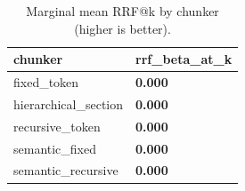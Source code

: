\begin{table}[t]
\centering
\small
\begin{tabular}{l l}
\toprule
chunker & rrf_beta_at_k \\
\midrule
fixed_token & \textbf{0.000} \\
hierarchical_section & \textbf{0.000} \\
recursive_token & \textbf{0.000} \\
semantic_fixed & \textbf{0.000} \\
semantic_recursive & \textbf{0.000} \\
\bottomrule
\end{tabular}
\caption{Marginal mean RRF@k by chunker (higher is better).}
\label{tab:marginal_chunker_rrf_beta_at_k}
\end{table}